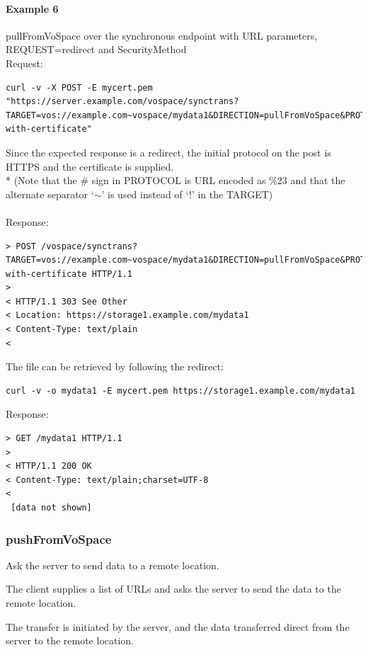 \documentclass[11pt,a4paper]{ivoa}
\begin{document}
\paragraph{Example 6}
pullFromVoSpace over the synchronous endpoint with URL parameters, REQUEST=redirect and SecurityMethod
\\[5px]
\noindent
Request:
\begin{lstlisting}
curl -v -X POST -E mycert.pem "https://server.example.com/vospace/synctrans?TARGET=vos://example.com~vospace/mydata1&DIRECTION=pullFromVoSpace&PROTOCOL=ivo://ivoa.net/vospace/core%23httpsget&REQUEST=redirect&SECURITYMETHOD=ivo://ivoa.net/sso%23tls-with-certificate"
\end{lstlisting}
Since the expected response is a redirect, the initial protocol on the post is HTTPS and the certificate is supplied.\\*
(Note that the \# sign in PROTOCOL is URL encoded as \%23 and that the alternate separator `$\mathtt{\sim}$' is used instead of `!' in the TARGET) \\
\\
Response:
\begin{lstlisting}
> POST /vospace/synctrans?TARGET=vos://example.com~vospace/mydata1&DIRECTION=pullFromVoSpace&PROTOCOL=ivo://ivoa.net/vospace/core\%23httpget&REQUEST=redirect&SECURITYMETHOD=ivo://ivoa.net/sso%23tls-with-certificate HTTP/1.1
>
< HTTP/1.1 303 See Other
< Location: https://storage1.example.com/mydata1
< Content-Type: text/plain
<
\end{lstlisting}
The file can be retrieved by following the redirect:
\begin{lstlisting}
curl -v -o mydata1 -E mycert.pem https://storage1.example.com/mydata1
\end{lstlisting}
Response:
\begin{lstlisting}
> GET /mydata1 HTTP/1.1
>
< HTTP/1.1 200 OK
< Content-Type: text/plain;charset=UTF-8
<
 [data not shown]
\end{lstlisting}

\subsubsection{pushFromVoSpace}
\label{subsubsec:pushfromvospace}
Ask the server to send data to a remote location.

The client supplies a list of URLs and asks the server to send the data to the remote location.

The transfer is initiated by the server, and the data transferred direct from the server to the remote location.
\end{document}
